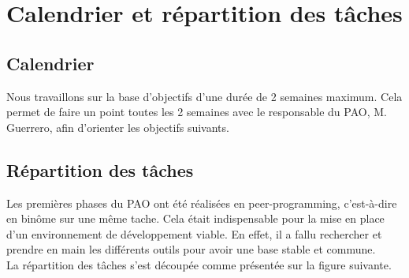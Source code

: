 \chapter{Calendrier et répartition des tâches}

\section{Calendrier}

	Nous travaillons sur la base d'objectifs d'une durée de 2 semaines maximum. Cela permet de faire un point toutes les 2 semaines avec le responsable du PAO, M. Guerrero, afin d'orienter les objectifs suivants.

\section{Répartition des tâches}
	Les premières phases du PAO ont été réalisées en peer-programming, c'est-à-dire en binôme sur une même tache. Cela était indispensable pour la mise en place d'un environnement de développement viable. En effet, il a fallu rechercher et prendre en main les différents outils pour avoir une base stable et commune. \\

	La répartition des tâches s'est découpée comme présentée sur la figure suivante.


